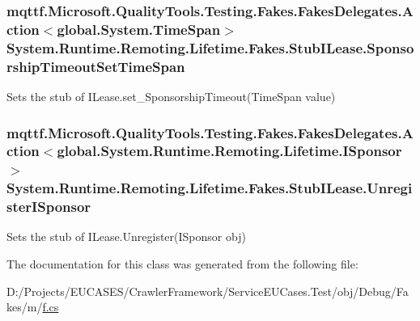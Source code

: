 \hypertarget{class_system_1_1_runtime_1_1_remoting_1_1_lifetime_1_1_fakes_1_1_stub_i_lease_ae6bad36356d4c2d177d7b915045d4b12}{
\subsubsection[{Sponsorship\-Timeout\-Set\-Time\-Span}]{\setlength{\rightskip}{0pt plus 5cm}mqttf.\-Microsoft.\-Quality\-Tools.\-Testing.\-Fakes.\-Fakes\-Delegates.\-Action$<$global.\-System.\-Time\-Span$>$ System.\-Runtime.\-Remoting.\-Lifetime.\-Fakes.\-Stub\-I\-Lease.\-Sponsorship\-Timeout\-Set\-Time\-Span}}\label{class_system_1_1_runtime_1_1_remoting_1_1_lifetime_1_1_fakes_1_1_stub_i_lease_ae6bad36356d4c2d177d7b915045d4b12}


Sets the stub of I\-Lease.\-set\-\_\-\-Sponsorship\-Timeout(\-Time\-Span value)

\hypertarget{class_system_1_1_runtime_1_1_remoting_1_1_lifetime_1_1_fakes_1_1_stub_i_lease_a01949d3e221bb1cca7fb09e09174081c}{
\subsubsection[{Unregister\-I\-Sponsor}]{\setlength{\rightskip}{0pt plus 5cm}mqttf.\-Microsoft.\-Quality\-Tools.\-Testing.\-Fakes.\-Fakes\-Delegates.\-Action$<$global.\-System.\-Runtime.\-Remoting.\-Lifetime.\-I\-Sponsor$>$ System.\-Runtime.\-Remoting.\-Lifetime.\-Fakes.\-Stub\-I\-Lease.\-Unregister\-I\-Sponsor}}\label{class_system_1_1_runtime_1_1_remoting_1_1_lifetime_1_1_fakes_1_1_stub_i_lease_a01949d3e221bb1cca7fb09e09174081c}


Sets the stub of I\-Lease.\-Unregister(\-I\-Sponsor obj)



The documentation for this class was generated from the following file\-:\begin{DoxyCompactItemize}
\item 
D\-:/\-Projects/\-E\-U\-C\-A\-S\-E\-S/\-Crawler\-Framework/\-Service\-E\-U\-Cases.\-Test/obj/\-Debug/\-Fakes/m/\hyperlink{m_2f_8cs}{f.\-cs}\end{DoxyCompactItemize}
